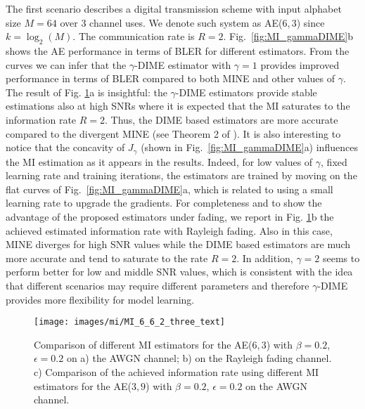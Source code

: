 The first scenario describes a digital transmission scheme with input alphabet size $M=64$ over $3$ channel uses. We denote such system as AE($6,3$) since $k = \log_2(M)$. The communication rate is $R=2$. Fig.~\ref{fig:MI_gammaDIME}b shows the AE performance in terms of BLER for different estimators. From the curves we can infer that the $\gamma$-DIME estimator with $\gamma=1$ provides improved performance in terms of BLER compared to both MINE and other values of $\gamma$. The result of Fig. \ref{fig:MI_MI_6_6}a is insightful: the $\gamma$-DIME estimators provide stable estimations also at high SNRs where it is expected that the MI saturates to the information rate $R=2$. Thus, the DIME based estimators are more accurate compared to the divergent MINE (see Theorem 2 of \cite{Song2020}). It is also interesting to notice that the concavity of $J_{\gamma}$ (shown in Fig.~\ref{fig:MI_gammaDIME}a) influences the MI estimation as it appears in the results. Indeed, for low values of $\gamma$, fixed learning rate and training iterations, the estimators are trained by moving on the flat curves of Fig.~\ref{fig:MI_gammaDIME}a, which is related to using a small learning rate to upgrade the gradients. For completeness and to show the advantage of the proposed estimators under fading, we report in Fig. \ref{fig:MI_MI_6_6}b the achieved estimated information rate with Rayleigh fading. Also in this case, MINE diverges for high SNR values while the DIME based estimators are much more accurate and tend to saturate to the rate $R=2$.  In addition, $\gamma =2$ seems to perform better for low and middle SNR values, which is consistent with the idea that different scenarios may require different parameters and therefore $\gamma$-DIME provides more flexibility for model learning.

\begin{figure}
\centering
  	\texttt{[image: images/mi/MI\_6\_6\_2\_three\_text]}
  	\caption{Comparison of different MI estimators for the AE($6,3$) with $\beta = 0.2$, $\epsilon = 0.2$ on a) the AWGN channel; b) on the Rayleigh fading channel. c) Comparison of the achieved information rate using different MI estimators for the AE($3,9$) with $\beta = 0.2$, $\epsilon = 0.2$ on the AWGN channel.}
  	\label{fig:MI_MI_6_6}
\end{figure}


